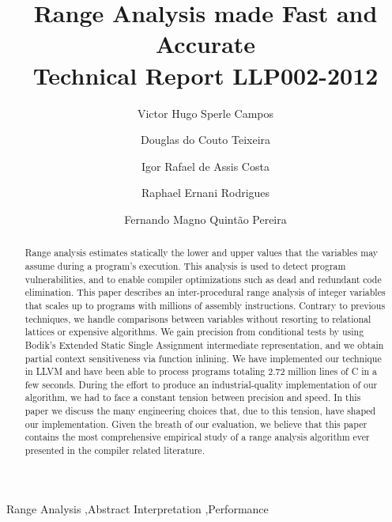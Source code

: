 \documentclass[preprint]{elsarticle}
\begin{document}
\begin{frontmatter}

\title{Range Analysis made Fast and Accurate \\
Technical Report LLP002-2012}


\author[llp]{Victor Hugo Sperle Campos}

\author[llp]{Douglas do Couto Teixeira}

\author[llp]{Igor Rafael de Assis Costa}

\author[llp]{Raphael Ernani Rodrigues}

\author[llp]{Fernando Magno Quint\~{a}o Pereira}


\address[llp]{UFMG -- 6627 Ant\^{o}nio Carlos Av, 31.270-010, Belo Horizonte, Brazil}

\begin{abstract}
Range analysis estimates statically the lower and upper values that
the variables may assume during a program's execution.
This analysis is used to detect program vulnerabilities, and to enable compiler
optimizations such as dead and redundant code elimination.
This paper describes an inter-procedural range analysis of integer variables
that scales up to programs with millions of assembly instructions.
Contrary to previous techniques, we handle comparisons between variables
without resorting to relational lattices or expensive algorithms.
We gain precision from conditional tests by using Bodik's Extended Static
Single Assignment intermediate representation, and we obtain partial
context sensitiveness via function inlining.
We have implemented our technique in LLVM and have been able to process
programs totaling 2.72 million lines of C in a few seconds.
During the effort to produce an industrial-quality implementation of our
algorithm, we had to face a constant tension between precision and speed.
In this paper we discuss the many engineering choices that, due to this tension,
have shaped our implementation.
Given the breath of our evaluation, we believe that this paper contains the most
comprehensive empirical study of a range analysis algorithm ever presented in
the compiler related literature.
\end{abstract}

\begin{keyword}
Range Analysis \sep Abstract Interpretation \sep Performance
\end{keyword}

\end{frontmatter}
\end{document}
